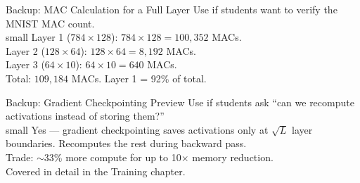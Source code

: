 \documentclass[aspectratio=169, 12pt]{beamer}
\begin{document}
\begin{frame}{Backup: MAC Calculation for a Full Layer}
\small
Use if students want to verify the MNIST MAC count.\\small Layer 1 ($784 \times 128$): $784 \times 128 = 100{,}352$ MACs.\\ Layer 2 ($128 \times 64$): $128 \times 64 = 8{,}192$ MACs.\\ Layer 3 ($64 \times 10$): $64 \times 10 = 640$ MACs.\\ Total: $109{,}184$ MACs. Layer 1 = 92\% of total.
\end{frame}

\begin{frame}{Backup: Gradient Checkpointing Preview}
\small
Use if students ask ``can we recompute activations instead of storing them?''\\small Yes --- gradient checkpointing saves activations only at $\sqrt{L}$ layer boundaries. Recomputes the rest during backward pass.\\ Trade: $\sim$33\% more compute for up to 10$\times$ memory reduction.\\ Covered in detail in the Training chapter.
\end{frame}
\end{document}
